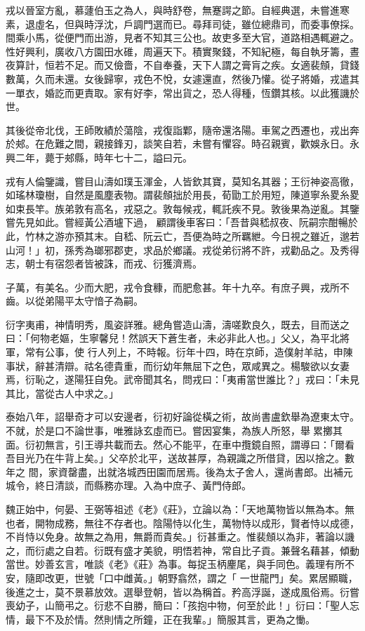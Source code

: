 \begin{pinyinscope}
 戎以晉室方亂，慕蘧伯玉之為人，與時舒卷，無蹇諤之節。自經典選，未嘗進寒素，退虛名，但與時浮沈，戶調門選而已。尋拜司徒，雖位總鼎司，而委事僚採。間乘小馬，從便門而出游，見者不知其三公也。故吏多至大官，道路相遇輒避之。性好興利，廣收八方園田水碓，周遍天下。積實聚錢，不知紀極，每自執牙籌，晝夜算計，恒若不足。而又儉嗇，不自奉養，天下人謂之膏肓之疾。女適裴頠，貸錢數萬，久而未還。女後歸寧，戎色不悅，女遽還直，然後乃懽。從子將婚，戎遣其
 一單衣，婚訖而更責取。家有好李，常出貨之，恐人得種，恆鑽其核。以此獲譏於世。



 其後從帝北伐，王師敗績於蕩陰，戎復詣鄴，隨帝還洛陽。車駕之西遷也，戎出奔於郟。在危難之間，親接鋒刃，談笑自若，未嘗有懼容。時召親賓，歡娛永日。永興二年，薨于郟縣，時年七十二，謚曰元。



 戎有人倫鑒識，嘗目山濤如璞玉渾金，人皆欽其寶，莫知名其器；王衍神姿高徹，如瑤林瓊樹，自然是風塵表物。謂裴頠拙於用長，荀勖工於用短，陳道寧糸畟糸畟如束長竿。族弟敦有高名，戎惡之。敦每候戎，輒託疾不見。敦後果為逆亂。其鑒嘗先見如此。嘗經黃公酒壚下過，
 顧謂後車客曰：「吾昔與嵇叔夜、阮嗣宗酣暢於此，竹林之游亦預其末。自嵇、阮云亡，吾便為時之所羈紲。今日視之雖近，邈若山河！」初，孫秀為瑯邪郡吏，求品於鄉議。戎從弟衍將不許，戎勸品之。及秀得志，朝士有宿怨者皆被誅，而戎、衍獲濟焉。



 子萬，有美名。少而大肥，戎令食穅，而肥愈甚。年十九卒。有庶子興，戎所不齒。以從弟陽平太守愔子為嗣。



 衍字夷甫，神情明秀，風姿詳雅。總角嘗造山濤，濤嗟歎良久，既去，目而送之曰：「何物老嫗，生寧馨兒！然誤天下蒼生者，未必非此人也。」父乂，為平北將軍，常有公事，使
 行人列上，不時報。衍年十四，時在京師，造僕射羊祜，申陳事狀，辭甚清辯。祜名德貴重，而衍幼年無屈下之色，眾咸異之。楊駿欲以女妻焉，衍恥之，遂陽狂自免。武帝聞其名，問戎曰：「夷甫當世誰比？」戎曰：「未見其比，當從古人中求之。」



 泰始八年，詔舉奇才可以安邊者，衍初好論從橫之術，故尚書盧欽舉為遼東太守。不就，於是口不論世事，唯雅詠玄虛而已。嘗因宴集，為族人所怒，舉累擲其面。衍初無言，引王導共載而去。然心不能平，在車中攬鏡自照，謂導曰：「爾看吾目光乃在牛背上矣。」父卒於北平，送故甚厚，為親識之所借貸，因以捨之。數年之
 間，家資罄盡，出就洛城西田園而居焉。後為太子舍人，還尚書郎。出補元城令，終日清談，而縣務亦理。入為中庶子、黃門侍郎。



 魏正始中，何晏、王弼等祖述《老》《莊》，立論以為：「天地萬物皆以無為本。無也者，開物成務，無往不存者也。陰陽恃以化生，萬物恃以成形，賢者恃以成德，不肖恃以免身。故無之為用，無爵而貴矣。」衍甚重之。惟裴頠以為非，著論以譏之，而衍處之自若。衍既有盛才美貌，明悟若神，常自比子貢。兼聲名藉甚，傾動當世。妙善玄言，唯談《老》《莊》為事。每捉玉柄麈尾，與手同色。義理有所不安，隨即改更，世號「口中雌黃。」朝野翕然，謂之「
 一世龍門」矣。累居顯職，後進之士，莫不景慕放效。選舉登朝，皆以為稱首。矜高浮誕，遂成風俗焉。衍嘗喪幼子，山簡弔之。衍悲不自勝，簡曰：「孩抱中物，何至於此！」衍曰：「聖人忘情，最下不及於情。然則情之所鐘，正在我輩。」簡服其言，更為之慟。




\end{pinyinscope}
